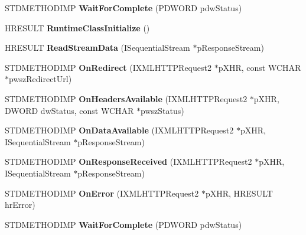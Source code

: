 \begin{DoxyCompactItemize}
\item 
\mbox{\label{classnetwork_1_1CXHR2Callback_acd2f4a04ca7f992ee35fdd3bd26b339d}} 
S\+T\+D\+M\+E\+T\+H\+O\+D\+I\+MP {\bfseries Wait\+For\+Complete} (P\+D\+W\+O\+RD pdw\+Status)
\item 
\mbox{\label{classnetwork_1_1CXHR2Callback_a0b409a974aa73213b058d9627a95bb62}} 
H\+R\+E\+S\+U\+LT {\bfseries Runtime\+Class\+Initialize} ()
\item 
\mbox{\label{classnetwork_1_1CXHR2Callback_a19e4f5c8202744a013a70d698154fb11}} 
H\+R\+E\+S\+U\+LT {\bfseries Read\+Stream\+Data} (I\+Sequential\+Stream $\ast$p\+Response\+Stream)
\item 
\mbox{\label{classnetwork_1_1CXHR2Callback_a9dd50427ce54fc693ac759789a0d6792}} 
S\+T\+D\+M\+E\+T\+H\+O\+D\+I\+MP {\bfseries On\+Redirect} (I\+X\+M\+L\+H\+T\+T\+P\+Request2 $\ast$p\+X\+HR, const W\+C\+H\+AR $\ast$pwsz\+Redirect\+Url)
\item 
\mbox{\label{classnetwork_1_1CXHR2Callback_ae3b194db3e72f3caf387612ac9965a56}} 
S\+T\+D\+M\+E\+T\+H\+O\+D\+I\+MP {\bfseries On\+Headers\+Available} (I\+X\+M\+L\+H\+T\+T\+P\+Request2 $\ast$p\+X\+HR, D\+W\+O\+RD dw\+Status, const W\+C\+H\+AR $\ast$pwsz\+Status)
\item 
\mbox{\label{classnetwork_1_1CXHR2Callback_a375202ac948f75f75b1223462fb73845}} 
S\+T\+D\+M\+E\+T\+H\+O\+D\+I\+MP {\bfseries On\+Data\+Available} (I\+X\+M\+L\+H\+T\+T\+P\+Request2 $\ast$p\+X\+HR, I\+Sequential\+Stream $\ast$p\+Response\+Stream)
\item 
\mbox{\label{classnetwork_1_1CXHR2Callback_a149422f9f87a0ba9d5979730356cd7ca}} 
S\+T\+D\+M\+E\+T\+H\+O\+D\+I\+MP {\bfseries On\+Response\+Received} (I\+X\+M\+L\+H\+T\+T\+P\+Request2 $\ast$p\+X\+HR, I\+Sequential\+Stream $\ast$p\+Response\+Stream)
\item 
\mbox{\label{classnetwork_1_1CXHR2Callback_a1c46653ef4df39f123ec02f3b149269d}} 
S\+T\+D\+M\+E\+T\+H\+O\+D\+I\+MP {\bfseries On\+Error} (I\+X\+M\+L\+H\+T\+T\+P\+Request2 $\ast$p\+X\+HR, H\+R\+E\+S\+U\+LT hr\+Error)
\item 
\mbox{\label{classnetwork_1_1CXHR2Callback_a6f554e4419c1de3f977bd058feb039e5}} 
S\+T\+D\+M\+E\+T\+H\+O\+D\+I\+MP {\bfseries Wait\+For\+Complete} (P\+D\+W\+O\+RD pdw\+Status)
\end{DoxyCompactItemize}
